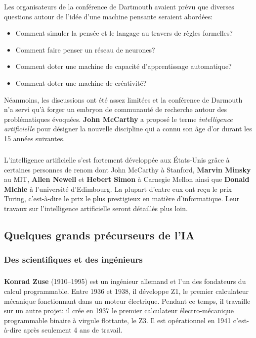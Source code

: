 Les organisateurs de la conférence de Dartmouth avaient prévu que diverses questions autour de l'idée d'une machine pensante seraient abordées:
\begin{itemize}
\item Comment simuler la pensée et le langage au travers de règles formelles?
\item Comment faire penser un réseau de neurones?
\item Comment doter une machine de capacité d'apprentissage automatique?
\item Comment doter une machine de créativité?
\end{itemize}
Néanmoins, les discussions ont été assez limitées et la conférence de Darmouth n'a servi qu'à forger un embryon de communauté de recherche autour des problématiques évoquées.
\textbf{John McCarthy} a proposé le terme \textit{intelligence artificielle} pour désigner la nouvelle discipline qui a connu son âge d'or durant les 15 années suivantes.

\subparagraph{}
L'intelligence artificielle s’est fortement développée aux États-Unis grâce à certaines personnes de renom dont John McCarthy à Stanford, \textbf{Marvin Minsky} au MIT, \textbf{Allen Newell} et \textbf{Hebert Simon} à Carnegie Mellon ainsi que \textbf{Donald Michie} à l’université d’Edimbourg. La plupart d’entre eux ont reçu le prix Turing, c'est-à-dire le prix le plus prestigieux en matière d'informatique. 
Leur travaux sur l'intelligence artificielle seront détaillés plus loin.




\subsection{Quelques grands précurseurs de l'IA}

\subsubsection{Des scientifiques et des ingénieurs}


\subparagraph{}
\textbf{Konrad Zuse} (1910–1995) est un ingénieur allemand et l’un des fondateurs du calcul programmable. Entre  1936 et 1938, il développe Z1, le premier calculateur mécanique fonctionnant dans un moteur électrique. Pendant ce temps, il travaille sur un autre projet: il crée en 1937 le premier calculateur électro-mécanique programmable binaire à virgule flottante, le Z3. Il est opérationnel en 1941 c'est-à-dire après seulement 4 ans de travail.


